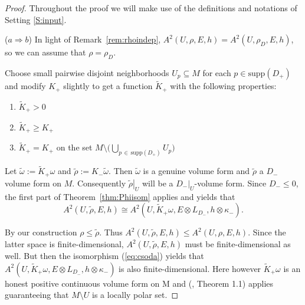 \documentclass[11pt]{amsart}
\theoremstyle{definition}
\begin{document}
\begin{proof}
Throughout the proof we will make use of the definitions and notations of Setting \ref{S:input}.

($a\Longrightarrow b$) In light of Remark~\ref{rem:rhoindep}, $A^2(U,\rho,E,h)=A^2(U,\rho_D,E,h)$, so we can assume that $\rho=\rho_D$.

    
    Choose small pairwise disjoint  neighborhoods $U_p \subseteq M$ for each $p\in \text{supp}(D_+)$ and modify $K_+$ slightly  to get a function $\widetilde K_+$  with the following properties:
    \begin{enumerate}
        \item $\widetilde K_+>0$
        \item $\widetilde K_+ \geq K_+$
        \item $\widetilde K_+=K_+$ on the set $M \setminus \big( \bigcup_{p\,\in\, \text{supp}(D_+)}U_p \big)$
    \end{enumerate}
    Let $\tilde\omega:=\widetilde K_+\omega$ and $\tilde\rho:=K_-\tilde\omega$. Then $\tilde\omega$  is a  genuine volume form and $\tilde\rho$  a  $D_-$
    volume form on $M$. Consequently $\left.\tilde\rho\right|_U$ will be a $\left.D_-\right|_U$-volume form. Since 
    $D_-\le0$, the first part of Theorem~\ref{thm:Phiisom} applies and yields that
    \begin{equation}\label{eq:csoda}    
    A^2(U,\tilde\rho,E,h)\cong A^2(U,\widetilde K_+\omega,E\otimes L_{D_-},h\otimes\kappa_-).
        \end{equation}

    By our construction $\rho\le\tilde\rho$. Thus 
    $A^2(U,\tilde\rho,E,h) \leq A^2(U,\rho,E,h)$. Since the latter space is finite-dimensional,  
     $A^2(U,\tilde\rho,E,h)$
     must be finite-dimensional as well.
     But then the isomorphism (\ref{eq:csoda})
    yields that
    $A^2(U,\widetilde K_+\omega,E\otimes L_{D_-},h\otimes\kappa_-)$
    is also finite-dimensional. Here however $\widetilde K_+\omega$ is an honest positive continuous volume form on M 
     and (\cite{GGV22}, Theorem 1.1) applies guaranteeing  that $M\setminus U$ is a locally polar set. 
     

\end{proof}
\end{document}
